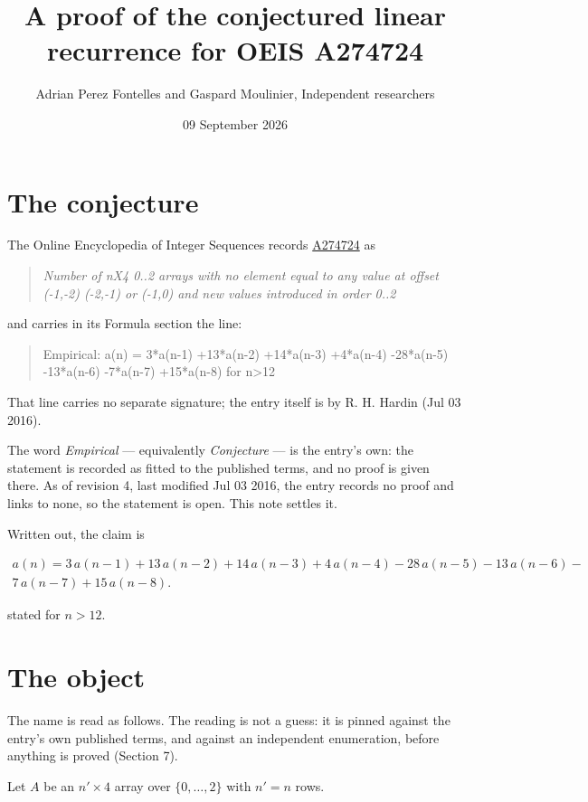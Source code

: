 \documentclass[11pt]{article}
\title{A proof of the conjectured linear recurrence for OEIS A274724}
\author{Adrian Perez Fontelles and Gaspard Moulinier, Independent researchers}
\date{09 September 2026}
\theoremstyle{definition}
\begin{document}
\maketitle
\section{The conjecture}

The Online Encyclopedia of Integer Sequences records \href{https://oeis.org/A274724}{A274724} as

\begin{quote}\itshape Number of nX4 0..2 arrays with no element equal to any value at offset (-1,-2) (-2,-1) or (-1,0) and new values introduced in order 0..2\end{quote}

and carries in its Formula section the line:

\begin{quote}\ttfamily Empirical: a(n) = 3*a(n-1) +13*a(n-2) +14*a(n-3) +4*a(n-4) -28*a(n-5) -13*a(n-6) -7*a(n-7) +15*a(n-8) for n>12\end{quote}

That line carries no separate signature; the entry itself is by R. H. Hardin (Jul 03 2016).

The word {\itshape Empirical} --- equivalently {\itshape Conjecture} --- is the entry's own: the statement is recorded as fitted to the published terms, and no proof is given there. As of revision 4, last modified Jul 03 2016, the entry records no proof and links to none, so the statement is open. This note settles it.

Written out, the claim is

\begin{multline*} a(n) = 3\,a(n-1) + 13\,a(n-2) + 14\,a(n-3) + 4\,a(n-4) - 28\,a(n-5) - 13\,a(n-6) - \\ 7\,a(n-7) + 15\,a(n-8). \end{multline*}

stated for $n > 12$.

\section{The object}

The name is read as follows. The reading is not a guess: it is pinned against the entry's own published terms, and against an independent enumeration, before anything is proved (Section 7).

Let $A$ be an $n' \times 4$ array over $\{0,\dots,2\}$ with $n' = n$ rows.
\end{document}
